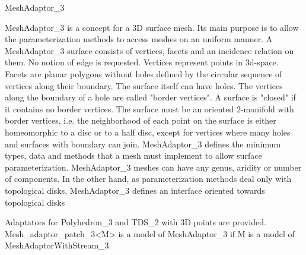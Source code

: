 

\begin{ccRefConcept}{MeshAdaptor_3}



\ccDefinition

MeshAdaptor\_3 is a concept for a 3D surface mesh. Its main purpose is to allow the parameterization methods to access meshes on an uniform manner.
A MeshAdaptor\_3 surface consists of vertices, facets and an incidence relation on them. No notion of edge is requested. Vertices represent points in 3d-space. Facets are planar polygons without holes defined by the circular sequence of vertices along their boundary. The surface itself can have holes. The vertices along the boundary of a hole are called "border vertices". A surface is "closed" if it contains no border vertices.
The surface must be an oriented 2-manifold with border vertices, i.e. the neighborhood of each point on the surface is either homeomorphic to a disc or to a half disc, except for vertices where many holes and surfaces with boundary can join.
MeshAdaptor\_3 defines the minimum types, data and methods that a mesh must implement to allow surface parameterization.
MeshAdaptor\_3 meshes can have any genus, aridity or number of components. In the other hand, as parameterization methods deal only with topological disks, MeshAdaptor\_3 defines an interface oriented towards topological disks


\ccHasModels

Adaptators for Polyhedron\_3 and TDS\_2 with 3D points are provided. Mesh\_adaptor\_patch\_3<M> is a model of MeshAdaptor\_3 if M is a model of MeshAdaptorWithStream\_3.

 \\
 \\



\end{ccRefConcept}
